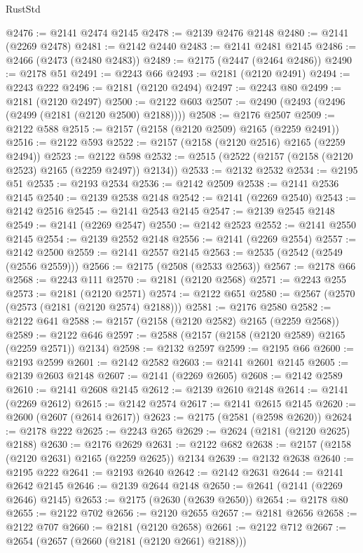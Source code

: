 \begin{lexlean}{RustStd}
\begin{coremodule}
@2476 := @2141 @2474 @2145
@2478 := @2139 @2476 @2148
@2480 := @2141 (@2269 @2478)
@2481 := @2142 @2440
@2483 := @2141 @2481 @2145
@2486 := @2466 (@2473 (@2480 @2483))
@2489 := @2175 (@2447 (@2464 @2486))
@2490 := @2178 @51
@2491 := @2243 @66
@2493 := @2181 (@2120 @2491)
@2494 := @2243 @222
@2496 := @2181 (@2120 @2494)
@2497 := @2243 @80
@2499 := @2181 (@2120 @2497)
@2500 := @2122 @603
@2507 := @2490 (@2493 (@2496 (@2499 (@2181 (@2120 @2500) @2188))))
@2508 := @2176 @2507
@2509 := @2122 @588
@2515 := @2157 (@2158 (@2120 @2509) @2165 (@2259 @2491))
@2516 := @2122 @593
@2522 := @2157 (@2158 (@2120 @2516) @2165 (@2259 @2494))
@2523 := @2122 @598
@2532 := @2515 (@2522 (@2157 (@2158 (@2120 @2523) @2165 (@2259 @2497)) @2134))
@2533 := @2132 @2532
@2534 := @2195 @51
@2535 := @2193 @2534
@2536 := @2142 @2509
@2538 := @2141 @2536 @2145
@2540 := @2139 @2538 @2148
@2542 := @2141 (@2269 @2540)
@2543 := @2142 @2516
@2545 := @2141 @2543 @2145
@2547 := @2139 @2545 @2148
@2549 := @2141 (@2269 @2547)
@2550 := @2142 @2523
@2552 := @2141 @2550 @2145
@2554 := @2139 @2552 @2148
@2556 := @2141 (@2269 @2554)
@2557 := @2142 @2500
@2559 := @2141 @2557 @2145
@2563 := @2535 (@2542 (@2549 (@2556 @2559)))
@2566 := @2175 (@2508 (@2533 @2563))
@2567 := @2178 @66
@2568 := @2243 @111
@2570 := @2181 (@2120 @2568)
@2571 := @2243 @255
@2573 := @2181 (@2120 @2571)
@2574 := @2122 @651
@2580 := @2567 (@2570 (@2573 (@2181 (@2120 @2574) @2188)))
@2581 := @2176 @2580
@2582 := @2122 @641
@2588 := @2157 (@2158 (@2120 @2582) @2165 (@2259 @2568))
@2589 := @2122 @646
@2597 := @2588 (@2157 (@2158 (@2120 @2589) @2165 (@2259 @2571)) @2134)
@2598 := @2132 @2597
@2599 := @2195 @66
@2600 := @2193 @2599
@2601 := @2142 @2582
@2603 := @2141 @2601 @2145
@2605 := @2139 @2603 @2148
@2607 := @2141 (@2269 @2605)
@2608 := @2142 @2589
@2610 := @2141 @2608 @2145
@2612 := @2139 @2610 @2148
@2614 := @2141 (@2269 @2612)
@2615 := @2142 @2574
@2617 := @2141 @2615 @2145
@2620 := @2600 (@2607 (@2614 @2617))
@2623 := @2175 (@2581 (@2598 @2620))
@2624 := @2178 @222
@2625 := @2243 @265
@2629 := @2624 (@2181 (@2120 @2625) @2188)
@2630 := @2176 @2629
@2631 := @2122 @682
@2638 := @2157 (@2158 (@2120 @2631) @2165 (@2259 @2625)) @2134
@2639 := @2132 @2638
@2640 := @2195 @222
@2641 := @2193 @2640
@2642 := @2142 @2631
@2644 := @2141 @2642 @2145
@2646 := @2139 @2644 @2148
@2650 := @2641 (@2141 (@2269 @2646) @2145)
@2653 := @2175 (@2630 (@2639 @2650))
@2654 := @2178 @80
@2655 := @2122 @702
@2656 := @2120 @2655
@2657 := @2181 @2656
@2658 := @2122 @707
@2660 := @2181 (@2120 @2658)
@2661 := @2122 @712
@2667 := @2654 (@2657 (@2660 (@2181 (@2120 @2661) @2188)))

\end{coremodule}
\end{lexlean}
